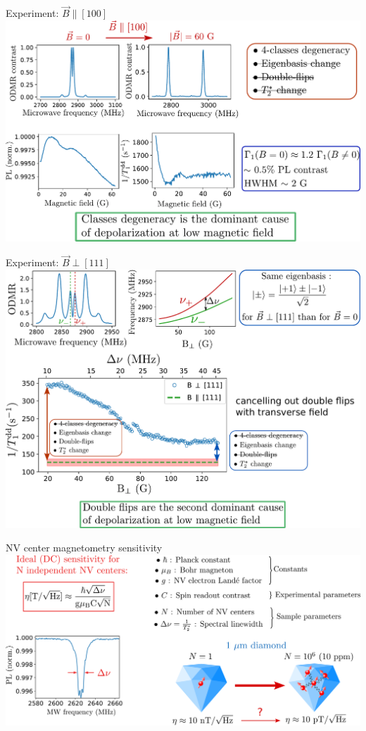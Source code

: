 \documentclass{beamer}
\begin{document}
\begin{frame}{Experiment: $\vec B \parallel [100]$}
\centering
\includegraphics[width=\textwidth,height=0.85\textheight,keepaspectratio]{Slide_T1_PL_100}
\end{frame}

\begin{frame}{Experiment: $\vec B \perp [111]$}
\centering
\includegraphics[width=\textwidth,height=0.85\textheight,keepaspectratio]{slide_champs_transverse}
\end{frame}

\begin{frame}{NV center magnetometry sensitivity}
\centering
\includegraphics[width=\textwidth,height=0.85\textheight,keepaspectratio]{Slide_NV_limite_sensi}
\end{frame}
\end{document}
